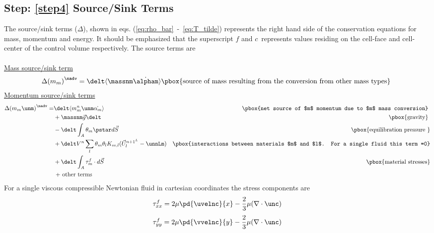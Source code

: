 \documentclass[fleqn]{article}
\begin{document}
{\subsection{Step: \ref{step4} \textsf{Source/Sink Terms}}
The source/sink terms ($\Delta$), shown in
eqs. (\ref{eq:rho_bar}~-~\ref{eq:T_tilde}) represents the right hand side
of the conservation equations for mass, momentum and energy.  It should be
emphasized that the superscript $f$ and $c$~represents values residing on
the cell-face and cell-center of the control volume respectively.  The source
terms are\\
\\
\underline{\textsf{Mass source/sink term}}
\begin{alignat}{3}
    \Delta{(m_{m})}^{\nadv} =
   \delt\langle \massnm \dot{\alpham} \rangle
   \text{\pbox{source of mass resulting from the conversion from other mass types} }
\end{alignat}
\underline{\textsf{Momentum source/sink terms}}
\begin{alignat}{3}
    \Delta{(m_{m}\unm)}^{\nadv}  = 
&   \delt\langle m^{n}_{m} \unm \dot{\alpha_{m}} \rangle   
&   \text{ \pbox{net source of $m$ momentum due to $m$ mass conversion}  }\\ 
&+  \massnm \vec{g}\delt 
&   \text{\pbox{gravity} } \\
& - \delt \int_{A} \theta_m \pstar d\vec{S}  
&   \text{\pbox{equilibration pressure }} \\
& + \delt V^{n} \sum_l\theta_m \theta_{l} K_{m,l}(\vec{U}^{{n+1}^L}_{l} - \unnLm )   
&   \text{\pbox{interactions between materials $m$ and $l$.  For a single fluid this term =0}}\\
& + \delt \int_{A} \tau^{f}_{m} \cdot d\vec{S} 
&   \text{\pbox{material stresses}} \\
&   \text{  + other terms} \notag
\end{alignat}
%
For a single viscous compressible Newtonian fluid in cartesian coordinates
the stress components are
%
\begin{equation}
    \label{eq:tau_xx}
    \tau^{f}_{xx} = 2\mu \pd{\uvelnc}{x} - \frac{2}{3}\mu(\nabla \cdot \unc)
\end{equation}
%
\begin{equation}
    \tau^{f}_{yy} = 2\mu \pd{\vvelnc}{y} - \frac{2}{3}\mu(\nabla \cdot \unc)
\end{equation}
%
\begin{equation}

\end{equation}}
\end{document}
